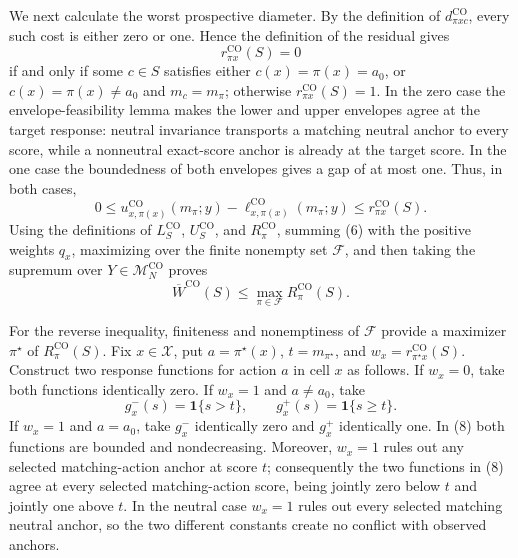 We next calculate the worst prospective diameter.  By the definition of \(d^{\mathrm{CO}}_{\pi xc}\), every such cost is either zero or one.  Hence the definition of the residual gives
\[
r^{\mathrm{CO}}_{\pi x}(S)=0
\]
if and only if some \(c\in S\) satisfies either \(c(x)=\pi(x)=a_0\), or \(c(x)=\pi(x)\neq a_0\) and \(m_c=m_\pi\); otherwise \(r^{\mathrm{CO}}_{\pi x}(S)=1\).  In the zero case the envelope-feasibility lemma makes the lower and upper envelopes agree at the target response: neutral invariance transports a matching neutral anchor to every score, while a nonneutral exact-score anchor is already at the target score.  In the one case the boundedness of both envelopes gives a gap of at most one.  Thus, in both cases,
\[
0\leq
u^{\mathrm{CO}}_{x,\pi(x)}(m_\pi;y)
-\ell^{\mathrm{CO}}_{x,\pi(x)}(m_\pi;y)
\leq r^{\mathrm{CO}}_{\pi x}(S).
\tag{6}
\]
Using the definitions of \(L^{\mathrm{CO}}_S\), \(U^{\mathrm{CO}}_S\), and \(R^{\mathrm{CO}}_\pi\), summing (6) with the positive weights \(q_x\), maximizing over the finite nonempty set \(\mathcal F\), and then taking the supremum over \(Y\in\mathcal M_N^{\mathrm{CO}}\) proves
\[
\overline W^{\mathrm{CO}}(S)
\leq \max_{\pi\in\mathcal F}R^{\mathrm{CO}}_\pi(S).
\tag{7}
\]

For the reverse inequality, finiteness and nonemptiness of \(\mathcal F\) provide a maximizer \(\pi^\star\) of \(R^{\mathrm{CO}}_\pi(S)\).  Fix \(x\in\mathcal X\), put \(a=\pi^\star(x)\), \(t=m_{\pi^\star}\), and \(w_x=r^{\mathrm{CO}}_{\pi^\star x}(S)\).  Construct two response functions for action \(a\) in cell \(x\) as follows.  If \(w_x=0\), take both functions identically zero.  If \(w_x=1\) and \(a\neq a_0\), take
\[
g_x^-(s)=\mathbf 1\{s>t\},
\qquad
g_x^+(s)=\mathbf 1\{s\geq t\}.
\tag{8}
\]
If \(w_x=1\) and \(a=a_0\), take \(g_x^-\) identically zero and \(g_x^+\) identically one.  In (8) both functions are bounded and nondecreasing.  Moreover, \(w_x=1\) rules out any selected matching-action anchor at score \(t\); consequently the two functions in (8) agree at every selected matching-action score, being jointly zero below \(t\) and jointly one above \(t\).  In the neutral case \(w_x=1\) rules out every selected matching neutral anchor, so the two different constants create no conflict with observed anchors.

